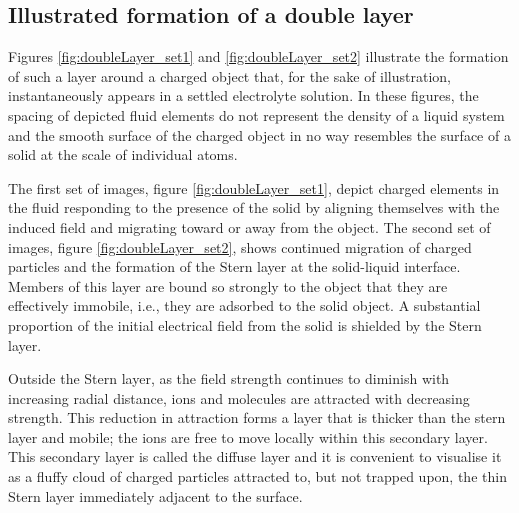 \subsection{Illustrated formation of a double layer}
    Figures \ref{fig:doubleLayer_set1} and \ref{fig:doubleLayer_set2} illustrate the formation of such a layer around a charged object that, for the sake of illustration, instantaneously appears in a settled electrolyte solution. In these figures, the spacing of depicted fluid elements do not represent the density of a liquid system and the smooth surface of the charged object in no way resembles the surface of a solid at the scale of individual atoms.

    The first set of images, figure \ref{fig:doubleLayer_set1}, depict charged elements in the fluid responding to the presence of the solid by aligning themselves with the induced field and migrating toward or away from the object. The second set of images, figure \ref{fig:doubleLayer_set2}, shows continued migration of charged particles and the formation of the Stern layer at the solid-liquid interface. Members of this layer are bound so strongly to the object that they are effectively immobile, i.e., they are adsorbed to the solid object. A substantial proportion of the initial electrical field from the solid is shielded by the Stern layer.

    Outside the Stern layer, as the field strength continues to diminish with increasing radial distance, ions and molecules are attracted with decreasing strength. This reduction in attraction forms a layer that is thicker than the stern layer and mobile; the ions are free to move locally within this secondary layer. This secondary layer is called the diffuse layer and it is convenient to visualise it as a fluffy cloud of charged particles attracted to, but not trapped upon, the thin Stern layer immediately adjacent to the surface.



%

